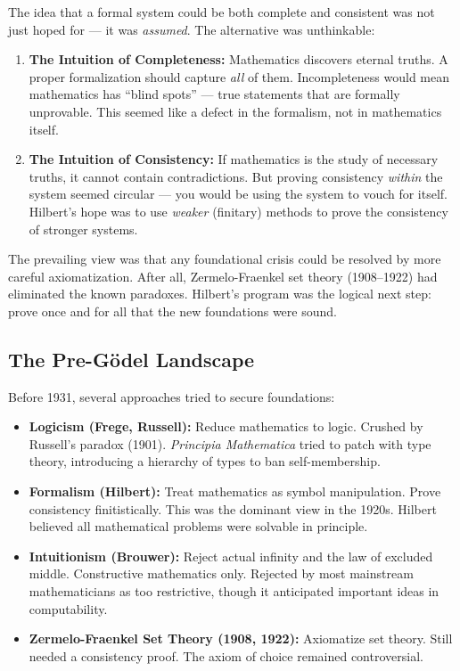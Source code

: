 The idea that a formal system could be both complete and consistent was not just hoped for --- it was \emph{assumed}. The alternative was unthinkable:

\begin{enumerate}
\item \textbf{The Intuition of Completeness:} Mathematics discovers eternal truths. A proper formalization should capture \emph{all} of them. Incompleteness would mean mathematics has ``blind spots'' --- true statements that are formally unprovable. This seemed like a defect in the formalism, not in mathematics itself.

\item \textbf{The Intuition of Consistency:} If mathematics is the study of necessary truths, it cannot contain contradictions. But proving consistency \emph{within} the system seemed circular --- you would be using the system to vouch for itself. Hilbert's hope was to use \emph{weaker} (finitary) methods to prove the consistency of stronger systems.
\end{enumerate}

The prevailing view was that any foundational crisis could be resolved by more careful axiomatization. After all, Zermelo-Fraenkel set theory (1908--1922) had eliminated the known paradoxes. Hilbert's program was the logical next step: prove once and for all that the new foundations were sound.

\subsection{The Pre-Gödel Landscape}
\label{sec:godel:landscape}

Before 1931, several approaches tried to secure foundations:

\begin{itemize}
\item \textbf{Logicism (Frege, Russell):} Reduce mathematics to logic. Crushed by Russell's paradox (1901). \emph{Principia Mathematica} tried to patch with type theory, introducing a hierarchy of types to ban self-membership.
\item \textbf{Formalism (Hilbert):} Treat mathematics as symbol manipulation. Prove consistency finitistically. This was the dominant view in the 1920s. Hilbert believed all mathematical problems were solvable in principle.
\item \textbf{Intuitionism (Brouwer):} Reject actual infinity and the law of excluded middle. Constructive mathematics only. Rejected by most mainstream mathematicians as too restrictive, though it anticipated important ideas in computability.
\item \textbf{Zermelo-Fraenkel Set Theory (1908, 1922):} Axiomatize set theory. Still needed a consistency proof. The axiom of choice remained controversial.
\end{itemize}

